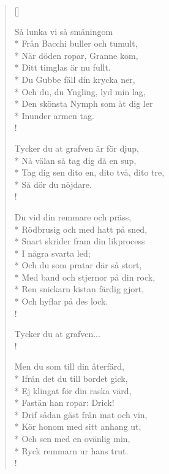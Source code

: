 
\settowidth{\versewidth}{Och du, du Yngling, lyd min lag,}



\begin{verse}[\versewidth]


Så lunka vi så småningom\\*
Från Bacchi buller och tumult,\\*
När döden ropar, Granne kom,\\*
Ditt timglas är nu fullt.\\*
Du Gubbe fäll din krycka ner,\\*
Och du, du Yngling, lyd min lag,\\*
Den skönsta Nymph som åt dig ler\\*
Inunder armen tag.\\!

Tycker du at grafven är för djup,\\*
Nå välan så tag dig då en sup,\\*
Tag dig sen dito en, dito två, dito tre,\\*
Så dör du nöjdare.\\!

Du vid din remmare och präss,\\*
Rödbrusig och med hatt på sned,\\*
Snart skrider fram din likprocess\\*
I några svarta led;\\*
Och du som pratar där så stort,\\*
Med band och stjernor på din rock,\\*
Ren snickarn kistan färdig gjort,\\*
Och hyflar på des lock.\\!

Tycker du at grafven...\\!

Men du som till din återfärd,\\*
Ifrån det du till bordet gick,\\*
Ej klingat för din raska värd,\\*
Fastän han ropar: Drick!\\*
Drif sådan gäst från mat och vin,\\*
Kör honom med sitt anhang ut,\\*
Och sen med en ovänlig min,\\*
Ryck remmarn ur hans trut.\\!


\end{verse}
